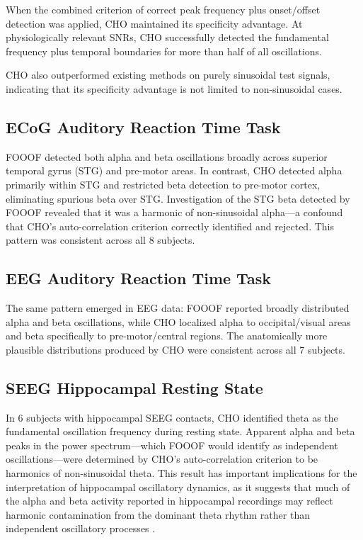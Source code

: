 \documentclass[12pt]{article}
\begin{document}
When the combined criterion of correct peak frequency plus onset/offset detection was applied, CHO maintained its specificity advantage. At physiologically relevant SNRs, CHO successfully detected the fundamental frequency plus temporal boundaries for more than half of all oscillations.

CHO also outperformed existing methods on purely sinusoidal test signals, indicating that its specificity advantage is not limited to non-sinusoidal cases.

\subsection{ECoG Auditory Reaction Time Task}

FOOOF detected both alpha and beta oscillations broadly across superior temporal gyrus (STG) and pre-motor areas. In contrast, CHO detected alpha primarily within STG and restricted beta detection to pre-motor cortex, eliminating spurious beta over STG. Investigation of the STG beta detected by FOOOF revealed that it was a harmonic of non-sinusoidal alpha---a confound that CHO's auto-correlation criterion correctly identified and rejected. This pattern was consistent across all 8 subjects.

\subsection{EEG Auditory Reaction Time Task}

The same pattern emerged in EEG data: FOOOF reported broadly distributed alpha and beta oscillations, while CHO localized alpha to occipital/visual areas and beta specifically to pre-motor/central regions. The anatomically more plausible distributions produced by CHO were consistent across all 7 subjects.

\subsection{SEEG Hippocampal Resting State}

In 6 subjects with hippocampal SEEG contacts, CHO identified theta as the fundamental oscillation frequency during resting state. Apparent alpha and beta peaks in the power spectrum---which FOOOF would identify as independent oscillations---were determined by CHO's auto-correlation criterion to be harmonics of non-sinusoidal theta. This result has important implications for the interpretation of hippocampal oscillatory dynamics, as it suggests that much of the alpha and beta activity reported in hippocampal recordings may reflect harmonic contamination from the dominant theta rhythm rather than independent oscillatory processes \citep{canolty2010functional, van2011alpha}.
\end{document}
